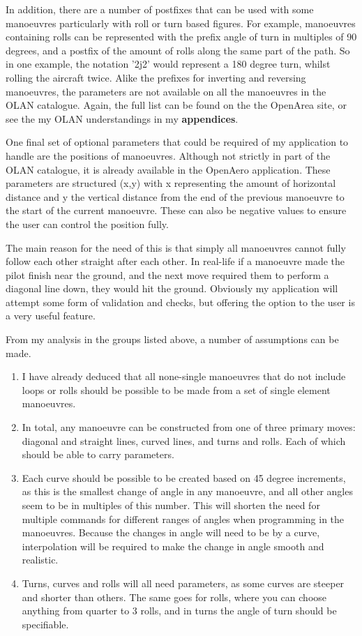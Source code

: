 In addition, there are a number of postfixes that can be used with some manoeuvres particularly with roll or turn based figures. For example, manoeuvres containing rolls can be represented with the prefix angle of turn in multiples of 90 degrees, and a postfix of the amount of rolls along the same part of the path. So in one example, the notation '2j2' would represent a 180 degree turn, whilst rolling the aircraft twice. Alike the prefixes for inverting and reversing manoeuvres, the parameters are not available on all the manoeuvres in the OLAN catalogue. Again, the full list can be found on the the OpenArea site, or see the my OLAN understandings in my \textbf{appendices}.

One final set of optional parameters that could be required of my application to handle are the positions of manoeuvres. Although not strictly in part of the OLAN catalogue, it is already available in the OpenAero application. These parameters are structured (x,y) with x representing the amount of horizontal distance and y the vertical distance from the end of the previous manoeuvre to the start of the current manoeuvre. These can also be negative values to ensure the user can control the position fully. 

The main reason for the need of this is that simply all manoeuvres cannot fully follow each other straight after each other. In real-life if a manoeuvre made the pilot finish near the ground, and the next move required them to perform a diagonal line down, they would hit the ground. Obviously my application will attempt some form of validation and checks, but offering the option to the user is a very useful feature.

From my analysis in the groups listed above, a number of assumptions can be made.
\begin{enumerate}
	\item I have already deduced that all none-single manoeuvres that do not include loops or rolls should be possible to be made from a set of single element manoeuvres.
	\item In total, any manoeuvre can be constructed from one of three primary moves: diagonal and straight lines, curved lines, and turns and rolls. Each of which should be able to carry parameters.
	\item Each curve should be possible to be created based on 45 degree increments, as this is the smallest change of angle in any manoeuvre, and all other angles seem to be in multiples of this number. This will shorten the need for multiple commands for different ranges of angles when programming in the manoeuvres. Because the changes in angle will need to be by a curve, interpolation will be required to make the change in angle smooth and realistic.
	\item Turns, curves and rolls will all need parameters, as some curves are steeper and shorter than others. The same goes for rolls, where you can choose anything from quarter to 3 rolls, and in turns the angle of turn should be specifiable.
\end{enumerate}

